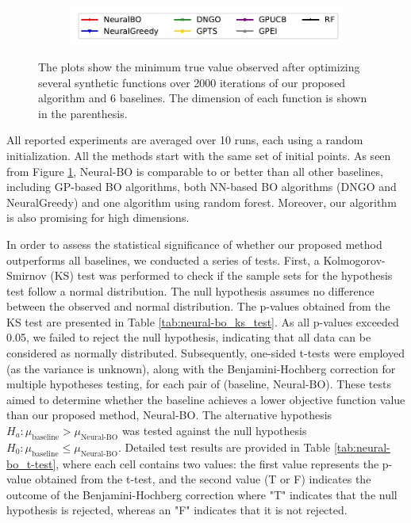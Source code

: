 \begin{figure}[htbp]
    \begin{subfigure}[b]{0.8\textwidth} 
        \centering
        \includegraphics[width=\textwidth]{Figures/Neural-BO/baselines.pdf}
    \end{subfigure}

    \caption{The plots show the minimum true value observed after optimizing several synthetic functions over 2000 iterations of our proposed algorithm and 6 baselines. The dimension of each function is shown in the parenthesis.}
    \label{fig:neural-bo_synthetic}
\end{figure}




All reported experiments are averaged over 10 runs, each using a random initialization. All the methods start with the same set of initial points. As seen from Figure \ref{fig:neural-bo_synthetic}, Neural-BO is comparable to or better than all other baselines, including GP-based BO algorithms, both NN-based BO algorithms (DNGO and NeuralGreedy) and one algorithm using random forest. Moreover, our algorithm is also promising for high dimensions. 



In order to assess the statistical significance of whether our proposed method outperforms all baselines, we conducted a series of tests. First, a Kolmogorov-Smirnov (KS) test was performed to check if the sample sets for the hypothesis test follow a normal distribution. The null hypothesis assumes no difference between the observed and normal distribution. The p-values obtained from the KS test are presented in Table \ref{tab:neural-bo_ks_test}.  As all p-values exceeded 0.05, we failed to reject the null hypothesis, indicating that all data can be considered as normally distributed. Subsequently, one-sided t-tests were employed (as the variance is unknown), along with the Benjamini-Hochberg correction for multiple hypotheses testing, for each pair of (baseline, Neural-BO). These tests aimed to determine whether the baseline achieves a lower objective function value than our proposed method, Neural-BO. The alternative hypothesis $H_a: \mu_\text{baseline} > \mu_{\text{Neural-BO}}$ was tested against the null hypothesis $H_0: \mu_\text{baseline} \le \mu_{\text{Neural-BO}}$. Detailed test results are provided in Table \ref{tab:neural-bo_t-test}, where each cell contains two values: the first value represents the p-value obtained from the t-test, and the second value (T or F) indicates the outcome of the Benjamini-Hochberg correction where "T" indicates that the null hypothesis is rejected, whereas an "F" indicates that it is not rejected.







